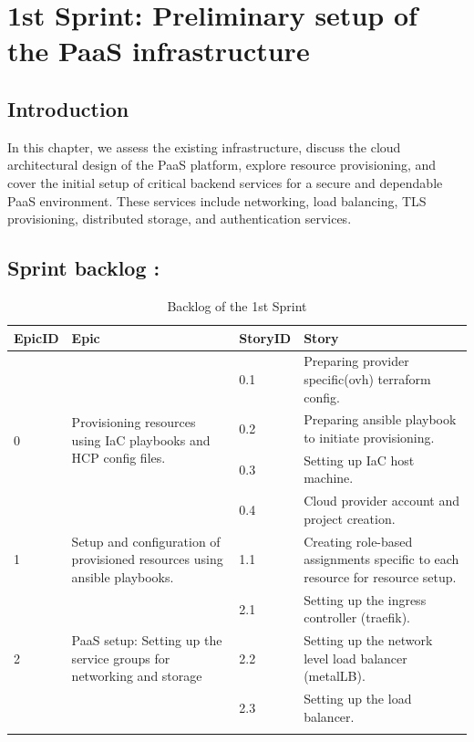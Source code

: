 \graphicspath{{./assets/}}
\setcounter{mtc}{2}
\chapter{1st Sprint: Preliminary setup of the PaaS infrastructure  }

\section*{Introduction}

\hspace{7mm}In this chapter, we assess the existing infrastructure, discuss the cloud architectural design of the PaaS platform, explore resource provisioning, and cover the initial setup of critical backend services for a secure and dependable PaaS environment. These services include networking, load balancing, TLS provisioning, distributed storage, and authentication services.

\section{Sprint backlog :}

\begin{longtable}[ht]{|m{1.5cm}|m{4cm}|m{1.5cm}|m{7cm}|}
\hline
{\textbf{EpicID}} & {\textbf{Epic}} & {\textbf{StoryID}} & {\textbf{Story}} \\
\endhead
\hline
\multirow{4}{1.5cm}{0} & \multirow{4}{4cm}{\raggedright Provisioning resources using IaC playbooks and HCP config files.}  &  0.1	 & Preparing provider specific(ovh) terraform config. \\
\cline{3-4}
& & 0.2 & Preparing ansible playbook to initiate provisioning. \\
\cline{3-4}
& & 0.3	& Setting up IaC host machine.  \\
\cline{3-4}
& & 0.4	& Cloud provider account and project creation.  \\
\hline
1  & Setup and configuration of provisioned resources using ansible playbooks.	 &  1.1	 &  Creating role-based assignments specific to each resource for resource setup. \\
\hline
\multirow{3}{1.5cm}{2} & \multirow{3}{4cm}{\raggedright PaaS setup: Setting up the service groups for networking and storage}	 &  2.1	 &  Setting up the ingress controller (traefik).\\
\cline{3-4}
& & 2.2 & Setting up the network level load balancer (metalLB). \\
\cline{3-4}
& & 2.3	& Setting up the load balancer. \\
\cline{3-4}
\hline
\caption{Backlog of the 1st Sprint}
\end{longtable}
